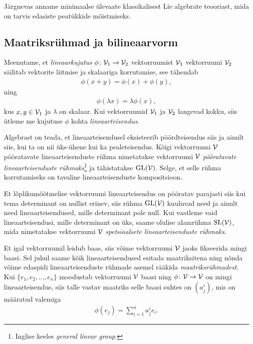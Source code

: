 Järgnevas anname minimaalse ülevaate klassikalisest Lie algebrate teooriast,
mida on tarvis edasiste peatükkide mõistmiseks.

\subsection{Maatriksrühmad ja bilineaarvorm}\label{subsec:mat-ryhmad-ja-bilinvorm}

Meenutame, et \emph{lineaarkujutus}
$\phi \colon \mathcal{V}_1 \to \mathcal{V}_2$ vektorruumist $\mathcal{V}_1$ vektorruumi $\mathcal{V}_2$ säilitab
vektorite liitmise ja skalaariga korrutamise, see tähendab
\begin{align*}
    \phi(x + y) = \phi(x) + \phi(y),
\end{align*}
ning
\begin{align*}
    \phi(\lambda x) = \lambda \phi(x),
\end{align*}
kus $x, y \in \mathcal{V}_1$ ja $\lambda$ on skalaar. Kui vektorruumid $\mathcal{V}_1$ ja $\mathcal{V}_2$
langevad kokku, siis ütleme me kujutuse $\phi$ kohta \emph{lineaarteisendus}.

Algebrast on teada, et lineaarteisendusel eksisteerib pöördteisendus siis ja
ainult siis, kui ta on nii üks-ühene kui ka pealeteisendus. Kõigi vektorruumi $\mathcal{V}$
pööratavate lineaarteisenduste rühma nimetatakse vektorruumi $\mathcal{V}$
\emph{pööratavate lineaarteisenduste rühmaks}\footnote{Inglise keeles
\emph{general linear group}.} ja tähistatakse $\operatorname{GL}(\mathcal{V})$. Selge, et selle
rühma korrutamiseks on tavaline lineaarteisenduste kompositsioon.

Et lõplikumõõtmelise vektorruumi lineaarteisendus on pööratav parajasti siis
kui tema determinant on nullist erinev, siis rühma $\operatorname{GL}(\mathcal{V})$ kuuluvad
need ja ainult need lineaarteisendused, mille determinant pole null.
Kui vaatleme vaid lineaarteisendusi, mille determinant on üks, saame olulise
alamrühma $\operatorname{SL}(\mathcal{V})$, mida nimetatakse vektorruumi $\mathcal{V}$
\emph{spetsiaalsete lineaarteisenduste rühmaks}.

Et igal vektorruumil leidub baas, siis võime vektorruumi $\mathcal{V}$ jaoks
fikseerida mingi baasi. Sel juhul
saame kõik lineaarteisendused esitada maatriksitena ning nõnda võime
edaspidi lineaarteisenduste rühmade asemel rääkida \emph{maatriksrühmadest}.
Kui $\{e_1, e_2, \dots, e_n\}$ moodustab vektorruumi $\mathcal{V}$ baasi ning
$\phi \colon \mathcal{V} \to \mathcal{V}$ on mingi lineaarteisendus, siis talle vastav maatriks
selle baasi suhtes on $(a^i_j)$, mis on määratud valemiga
\begin{align*}
    \phi(e_j) = \sum_{i=1}^{n} a^i_j e_i.
\end{align*}

